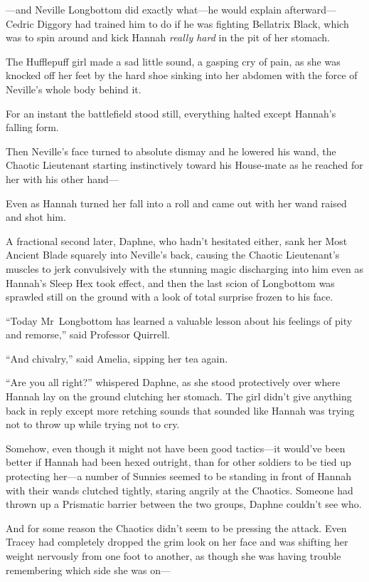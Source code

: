 —and Neville Longbottom did exactly what—he would explain
afterward—Cedric Diggory had trained him to do if he was fighting Bellatrix Black, which was to spin around and kick Hannah \emph{really hard} in the pit of her stomach.

The Hufflepuff girl made a sad little sound, a gasping cry of pain, as she was knocked off her feet by the hard shoe sinking into her abdomen with the force of Neville’s whole body behind it.

For an instant the battlefield stood still, everything halted except Hannah’s falling form.

Then Neville’s face turned to absolute dismay and he lowered his wand, the Chaotic Lieutenant starting instinctively toward his House-mate as he reached for her with his other hand—

Even as Hannah turned her fall into a roll and came out with her wand raised and shot him.

A fractional second later, Daphne, who hadn’t hesitated either, sank her Most Ancient Blade squarely into Neville’s back, causing the Chaotic Lieutenant’s muscles to jerk convulsively with the stunning magic discharging into him even as Hannah’s Sleep Hex took effect, and then the last scion of Longbottom was sprawled still on the ground with a look of total surprise frozen to his face.

\later

“Today Mr~Longbottom has learned a valuable lesson about his feelings of pity and remorse,” said Professor Quirrell.

“And chivalry,” said Amelia, sipping her tea again.

\later

“Are you all right?” whispered Daphne, as she stood protectively over where Hannah lay on the ground clutching her stomach. The girl didn’t give anything back in reply except more retching sounds that sounded like Hannah was trying not to throw up while trying not to cry.

Somehow, even though it might not have been good tactics—it would’ve been better if Hannah had been hexed outright, than for other soldiers to be tied up protecting her—a number of Sunnies seemed to be standing in front of Hannah with their wands clutched tightly, staring angrily at the Chaotics. Someone had thrown up a Prismatic barrier between the two groups, Daphne couldn’t see who.

And for some reason the Chaotics didn’t seem to be pressing the attack. Even Tracey had completely dropped the grim look on her face and was shifting her weight nervously from one foot to another, as though she was having trouble remembering which side she was on—

